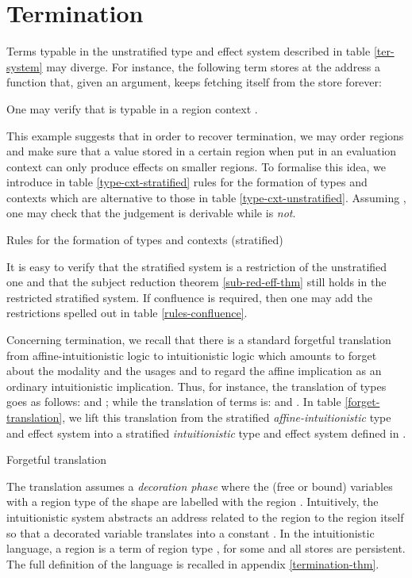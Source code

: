 \documentclass[11pt]{article}
\begin{document}
\section{Termination}\label{termination-sec}
Terms typable in the unstratified type and effect system described in table \ref{ter-system}
may diverge. For instance, the following term  stores at the address  a function 
that, given an argument, keeps fetching itself from the store forever:

One may verify that  is typable in a region context 
.

This example suggests that in order to recover termination,
we may order regions and make sure that
a value stored in a certain region when put in an
evaluation context can only produce effects on smaller regions.
To formalise this idea, we introduce
in table \ref{type-cxt-stratified} rules for the formation of
types and contexts which are alternative to those in
table  \ref{type-cxt-unstratified}.
Assuming ,
one may check that the judgement
  is derivable
while  is {\em not}.

\begin{table}
{\footnotesize
}
\caption{Rules for the formation of types and contexts (stratified)}\label{type-cxt-stratified}
\end{table}

It is easy to verify that the stratified system is a restriction of the
unstratified one and that the subject reduction theorem
\ref{sub-red-eff-thm} still holds in the restricted stratified
system. If confluence is required, then one may add 
the restrictions spelled out in table \ref{rules-confluence}.

Concerning termination, we recall that
there is a standard forgetful translation  from
affine-intuitionistic logic to intuitionistic logic which amounts to
forget about the modality  and the usages and to regard the affine
implication as an ordinary intuitionistic implication.  Thus, for
instance, the translation of types goes as follows:
 and 
;
while the translation of terms is:
 and  \quad 
.
In table \ref{forget-translation}, we lift this translation from the
stratified {\em affine-intuitionistic} type and effect system into a
stratified {\em intuitionistic} type and effect system defined in
\cite{Amadio09}.  
\begin{table}
{\footnotesize
}
\caption{Forgetful translation}\label{forget-translation}
\end{table}

The translation assumes a {\em decoration phase} where the (free or
bound) variables with a region type of the shape  are
labelled with the region . Intuitively, the intuitionistic system
abstracts an address  related to the region  to the
region  itself so that a decorated variable  translates into a
constant . In the intuitionistic language, a region  is a term of
region type , for some  and all stores are persistent.
The full definition of the language is recalled in
appendix \ref{termination-thm}.
\end{document}
